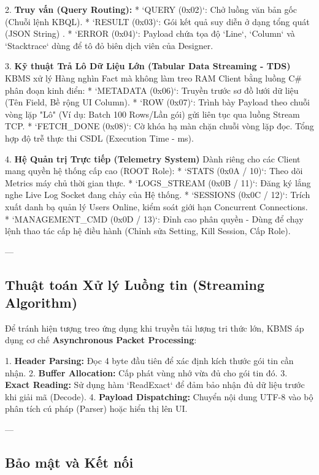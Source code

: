 2.  \textbf{Truy vấn (Query Routing):}
    *   `QUERY (0x02)`: Chở luồng văn bản gốc (Chuỗi lệnh KBQL).
    *   `RESULT (0x03)`: Gói kết quả suy diễn ở dạng tổng quát (JSON String) .
    *   `ERROR (0x04)`: Payload chứa tọa độ `Line`, `Column` và `Stacktrace` dùng để tô đỏ biên dịch viên của Designer.

3.  \textbf{Kỹ thuật Trả Lô Dữ Liệu Lớn (Tabular Data Streaming - TDS)}
    KBMS xử lý Hàng nghìn Fact mà không làm treo RAM Client bằng luồng C\# phân đoạn kinh điển:
    *   `METADATA (0x06)`: Truyền trước sơ đồ lưới dữ liệu (Tên Field, Bề rộng UI Column).
    *   `ROW (0x07)`: Trình bày Payload theo chuỗi vòng lặp "Lô" (Ví dụ: Batch 100 Rows/Lần gói) gửi liên tục qua luồng Stream TCP. 
    *   `FETCH\_DONE (0x08)`: Cờ khóa hạ màn chặn chuỗi vòng lặp đọc. Tổng hợp độ trễ thực thi CSDL (Execution Time - ms).

4.  \textbf{Hệ Quản trị Trực tiếp (Telemetry System)}
    Dành riêng cho các Client mang quyền hệ thống cấp cao (ROOT Role):
    *   `STATS (0x0A / 10)`: Theo dõi Metrics máy chủ thời gian thực.
    *   `LOGS\_STREAM (0x0B / 11)`: Đăng ký lắng nghe Live Log Socket đang chảy của Hệ thống.
    *   `SESSIONS (0x0C / 12)`: Trích xuất danh bạ quản lý Users Online, kiểm soát giới hạn Concurrent Connections.
    *   `MANAGEMENT\_CMD (0x0D / 13)`: Đỉnh cao phân quyền - Dùng để chạy lệnh thao tác cấp hệ điều hành (Chỉnh sửa Setting, Kill Session, Cấp Role).

---

\subsection{Thuật toán Xử lý Luồng tin (Streaming Algorithm)}

Để tránh hiện tượng treo ứng dụng khi truyền tải lượng tri thức lớn, KBMS áp dụng cơ chế \textbf{Asynchronous Packet Processing}:

1.  \textbf{Header Parsing:} Đọc 4 byte đầu tiên để xác định kích thước gói tin cần nhận.
2.  \textbf{Buffer Allocation:} Cấp phát vùng nhớ vừa đủ cho gói tin đó.
3.  \textbf{Exact Reading:} Sử dụng hàm `ReadExact` để đảm bảo nhận đủ dữ liệu trước khi giải mã (Decode).
4.  \textbf{Payload Dispatching:} Chuyển nội dung UTF-8 vào bộ phân tích cú pháp (Parser) hoặc hiển thị lên UI.

---

\subsection{Bảo mật và Kết nối}

